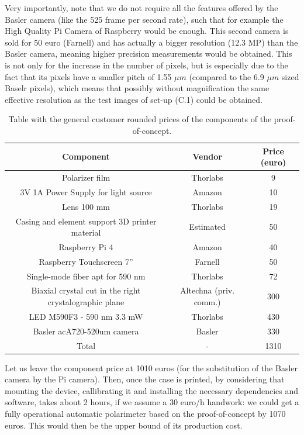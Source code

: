 \documentclass[11pt, a4paper, twoside]{article} %
\begin{document}
Very importantly, note that we do not require all the features offered by the Basler camera (like the 525 frame per second rate), such that for example the High Quality Pi Camera of Raspberry would be enough. This second camera is sold for 50 euro (Farnell) and has actually a bigger resolution (12.3 MP) than the Basler camera, meaning higher precision measurements would be obtained. This is not only for the increase in the number of pixels, but is especially due to the fact that its pixels have a smaller pitch of 1.55 $\mu m$ (compared to the 6.9 $\mu m$ sized Baselr pixels), which means that possibly without magnification the same effective resolution as the test images of set-up (C.1) could be obtained. \vspace{0.1cm}
\begin{table}[h!]
\caption{Table with the general customer rounded prices of the components of the proof-of-concept. }
\centering
\label{tab:prices}
\begin{tabular}{c|c|c}
\toprule
    {\bf Component}& {\bf Vendor } & {\bf Price (euro) } \\
\hline
Polarizer film & Thorlabs & 9\\
3V 1A Power Supply for light source & Amazon & 10\\
Lens 100 mm & Thorlabs & 19\\
Casing and element support 3D printer material & Estimated & 50 \\
Raspberry Pi 4 & Amazon & 40\\
Raspberry Touchscreen 7'' & Farnell & 50\\
Single-mode fiber apt for 590 nm & Thorlabs & 72 \\
Biaxial crystal cut in the right crystalographic plane & Altechna (priv. comm.) & 300 \\
LED M590F3 - 590 nm 3.3 mW & Thorlabs & 430\\
Basler acA720-520um camera & Basler & 330\\
\hline
Total & - & 1310 \\
\bottomrule
\end{tabular}
\end{table}

Let us leave the component price at 1010 euros (for the substitution of the Basler camera by the Pi camera). Then, once the case is printed, by considering that mounting the device, callibrating it and installing the necessary dependencies and software, takes about 2 hours, if we assume a 30 euro/h handwork: we could get a fully operational automatic polarimeter based on the proof-of-concept by 1070 euros. This would then be the upper bound of its production cost.\vspace{-0.1cm}
\end{document}

